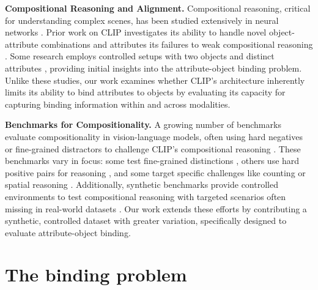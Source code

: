\noindent
\textbf{Compositional Reasoning and Alignment.} Compositional reasoning, critical for understanding complex scenes, has been studied extensively in neural networks \cite{hupkes2020compositionality, greff2020binding}. Prior work on CLIP investigates its ability to handle novel object-attribute combinations \cite{abbasi2024deciphering, bao2023prompting} and attributes its failures to weak compositional reasoning \cite{Lewis2024, Tang2023}. Some research employs controlled setups with two objects and distinct attributes \cite{Lewis2024, Tang2023}, providing initial insights into the attribute-object binding problem. Unlike these studies, our work examines whether CLIP’s architecture inherently limits its ability to bind attributes to objects by evaluating its capacity for capturing binding information within and across modalities.

\noindent
\textbf{Benchmarks for Compositionality.} A growing number of benchmarks evaluate compositionality in vision-language models, often using hard negatives or fine-grained distractors to challenge CLIP’s compositional reasoning \cite{zhao2022vl, ma2023crepe, ray2024cola, Yuksekgonul2023, hsieh2024sugarcrepe, thrush2022winoground}. These benchmarks vary in focus: some test fine-grained distinctions \cite{awal2024vismin}, others use hard positive pairs for reasoning \cite{kamath2024the}, and some target specific challenges like counting \cite{paiss2023teaching} or spatial reasoning \cite{kamath2023up}. Additionally, synthetic benchmarks provide controlled environments to test compositional reasoning with targeted scenarios often missing in real-world datasets \cite{Bordes2024, Johnson2017}. Our work extends these efforts by contributing a synthetic, controlled dataset with greater variation, specifically designed to evaluate attribute-object binding.




























\section{The binding problem}
 

